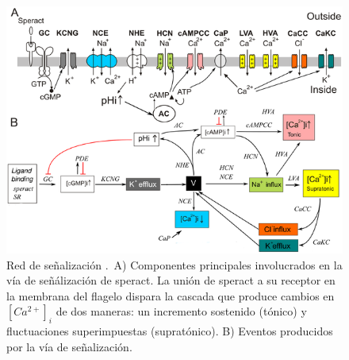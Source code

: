 \begin{figure}[hbt]
\includegraphics[width=0.9\linewidth]{gfx/redErizoBioquimica}
\caption[Red de se\~nalizaci\'on]{Red de se\~nalizaci\'on \citeauthor{Espinal2011} \citep{Espinal2011}.\ A) Componentes principales involucrados en la vía de señálización de speract. La unión de speract a su receptor en la membrana del flagelo dispara la cascada que produce cambios en $[Ca^{2+}]_i$ de dos maneras: un incremento sostenido (tónico) y fluctuaciones superimpuestas (supratónico). B) Eventos producidos por la vía de señalización.}\label{fig:erizobBioquimica}
\end{figure}

